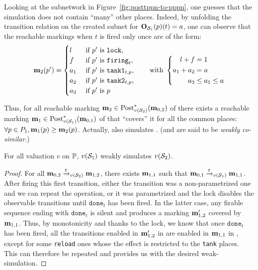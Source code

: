 Looking at the subnetwork in Figure~\ref{fig:posttppn-to-pppn},
one guesses that the simulation does not contain “many” other places.
Indeed, by unfolding the transition relation on the created subnet for $\matO_{\namePPN[1]}(p)(t) = a$, one can observe that the reachable markings when $t$ is fired only once are of the form:
\[
  \mar_2(p') =
  \begin{cases}
    l   &\text{ if } p' \text{ is } \mathtt{lock}, \\
    f   &\text{ if } p' \text{ is } \mathtt{firing}_t, \\
    a_1 &\text{ if } p' \text{ is } \mathtt{tank1}_{t,p}, \\
    a_2 &\text{ if } p' \text{ is } \mathtt{tank2}_{t,p}, \\
    a_3 &\text{ if } p' \text{ is } p
  \end{cases}
  \text{\qquad with }
  \left\{
    \begin{aligned}
      l + f &= 1 \\
      a_1 + a_2 &= a \\
      a_3 &\leq a_1 \leq a
    \end{aligned}
  \right.
\]

Thus, for all reachable marking $\mar_2 \in \Post^*_{v(\namePPN[2])}(\mar_{0,2})$ of \namePPN[2] there exists a reachable marking $\mar_1 \in \Post^*_{v(\namePPN[1])}(\mar_{0,1})$ of \namePPN[1] that ``covers'' it for all the common places: $\forall p \in \places_1, \mar_1(p) \geq \mar_2(p)$.
Actually, \namePPN[1] also simulates \namePPN[2].
(\namePPN[1] and \namePPN[2] are said to be \emph{weakly co-similar}.)

\begin{lemm}
  For all valuation $v$ on $\parameters$, $v(\namePPN[1])$ weakly simulates $v(\namePPN[2])$.
\end{lemm}

\begin{proof}
  For all $\mar_{0,2} \fire[{\val(\namePPN[2])}]{t} \mar_{1,2}$, there exists $\mar_{1,1}$ such that $\mar_{0,1} \fire[{v(\namePPN[1])}]{t} \mar_{1,1}$.
  After firing this first transition, either the transition was a non-parametrized one and we can repeat the operation, or it was parametrized and the lock disables the observable transitions until $\mathtt{done}_t$ has been fired.
  In the latter case, any firable sequence ending with $\mathtt{done}_t$ is silent and produces a marking $\mar'_{1,2}$ covered by $\mar_{1,1}$.
  Thus, by monotonicity and thanks to the lock, we know that once $\mathtt{done}_t$ has been fired, all the transitions enabled in $\mar'_{1,2}$ in \namePPN[2] are enabled in $\mar_{1,1}$ in \namePPN[1], except for some \texttt{reload} ones whose the effect is restricted to the \texttt{tank} places.
  This can therefore be repeated and provides us with the desired weak-simulation.
\end{proof}

